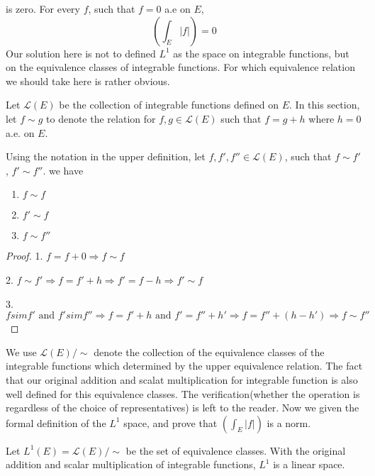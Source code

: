 \documentclass[lang=en, 12pt]{elegantbook}
\begin{document}
    is zero. For every $f$, such that $f= 0$ a.e on $E$, 
    $$\left(\int_E |f|\right) = 0$$
        Our solution here is not to defined $L^1$ as the space on 
    integrable functions, but on the equivalence classes of 
    integrable functions. For which equivalence relation we should
    take here is rather obvious.
        \begin{definition}
            Let $\mathcal{L}(E)$ be the collection of integrable 
        functions defined on $E$. In this section, let $f\sim g$ 
        to denote the relation for $f, g \in \mathcal{L}(E)$ such that $f= g + h$
        where $h=0$ a.e. on $E$.
        \end{definition}
        \begin{proposition}
            Using the notation in the upper definition, let 
        $f, f' ,f'' \in \mathcal{L}(E)$, such that $f\sim f'$,
        $f'\sim f''$. we have 
            \begin{enumerate}
                \item $f \sim f $
                \item $f' \sim f$
                \item $f \sim f''$
            \end{enumerate}
        \end{proposition}
        \begin{proof}
            1. $f = f +0 \Rightarrow f \sim f$\par
            2. $f \sim f' \Rightarrow f = f' +h \Rightarrow f' = f-h 
            \Rightarrow f' \sim f$\par
            3. $f sim f' \mbox{ and } f' sim f'' \Rightarrow 
            f = f' +h \mbox{ and } f'= f'' +h' \Rightarrow f = f'' +( h-h')
            \Rightarrow f \sim f''$\par
        \end{proof}
        We use $\mathcal{L}(E)/ \sim$ denote the collection of
    the equivalence classes of the integrable functions which 
    determined by the upper equivalence 
    relation. The fact that our original addition and scalat multiplication
    for integrable function is also well defined for this 
    equivalence classes. The verification(whether the operation is 
    regardless of the choice of representatives) is left to the reader.
        Now we given the formal definition of the $L^1$ space,
    and prove that $\left(\int_E |f|\right)$ is a norm.
        \begin{definition}[$L^1$ space]
            Let $L^1(E) = \mathcal{L}(E)/ \sim$ be the set 
        of equivalence classes. With the original addition and 
        scalar multiplication of integrable functions, $L^1$ is 
        a linear space.     
        \end{definition}
\end{document}

